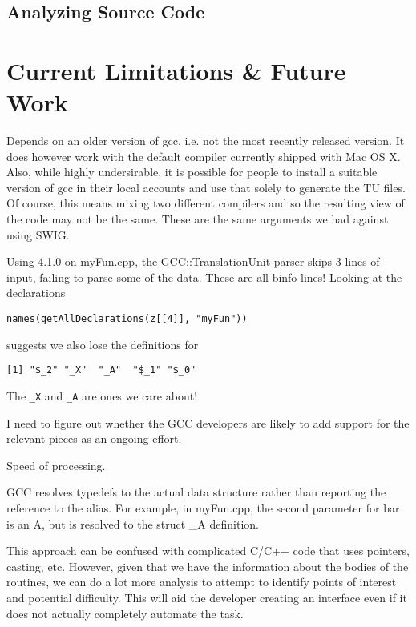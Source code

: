 \documentclass{article}
\begin{document}
\subsection{Analyzing Source Code}


\section{Current Limitations \& Future Work}

\item Depends on an older version of gcc,
i.e. not the most recently released version.
It does however work with the 
default compiler currently shipped with 
Mac OS X.
Also, while highly undersirable, it
is possible for people to install a suitable
version of gcc in their local accounts and use that
solely to generate the TU files.
Of course, this means mixing two different compilers
and so the resulting view of the code may not be the same.
These are the same arguments we had against using SWIG.

Using 4.1.0 on myFun.cpp, the GCC::TranslationUnit 
parser skips 3 lines of input, failing to parse some of the data.
These are all binfo lines!
Looking at the declarations
\begin{verbatim}
names(getAllDeclarations(z[[4]], "myFun"))
\end{verbatim}
suggests we also lose the definitions for
\begin{verbatim}
[1] "$_2" "_X"  "_A"  "$_1" "$_0"
\end{verbatim}
The \verb+_X+ and \verb+_A+ are ones we care about!


I need to figure out whether the GCC developers are
likely to add support for the relevant pieces as an ongoing effort.



\item Speed of processing.

\item GCC resolves typedefs to the actual data structure
rather than reporting the reference to the alias.
For example, in myFun.cpp, the second parameter for
bar is an A, but is resolved to the struct _A definition.

\item 
This approach can be confused with complicated
C/C++ code that uses pointers, casting, etc.
However, given that we have the information about the bodies
of the routines, we can do a lot more analysis
to attempt to identify points of interest and
potential difficulty.
This will aid the developer creating an interface
even if it does not actually completely automate the task.
\end{document}
